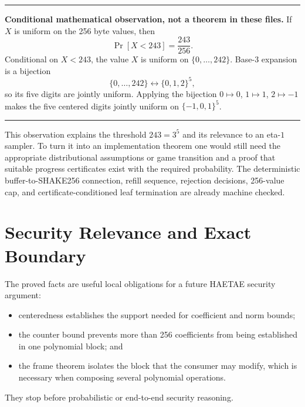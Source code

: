 \documentclass[11pt]{article}
\theoremstyle{definition}
\theoremstyle{plain}
\theoremstyle{remark}
\newenvironment{boundarybox}
  {\begin{center}\begin{minipage}{0.94\linewidth}\color{artifactred}\hrule\vspace{0.6em}\color{black}}
  {\vspace{0.6em}\color{artifactred}\hrule\end{minipage}\end{center}}
\begin{document}
\begin{boundarybox}
\textbf{Conditional mathematical observation, not a theorem in these files.}
If $X$ is uniform on the 256 byte values, then
\[
  \Pr[X<243]=\frac{243}{256}.
\]
Conditional on $X<243$, the value $X$ is uniform on
$\{0,\ldots,242\}$.  Base-3 expansion is a bijection
\[
  \{0,\ldots,242\}\longleftrightarrow\{0,1,2\}^{5},
\]
so its five digits are jointly uniform.  Applying the bijection
$0\mapsto0$, $1\mapsto1$, $2\mapsto-1$ makes the five centered digits jointly
uniform on $\{-1,0,1\}^{5}$.
\end{boundarybox}

This observation explains the threshold $243=3^5$ and its relevance to an
eta-$1$ sampler.  To turn it into an implementation theorem one would still
need the appropriate distributional assumptions or game transition and a
proof that suitable progress certificates exist with the required
probability.  The deterministic buffer-to-SHAKE256 connection, refill
sequence, rejection decisions, 256-value cap, and certificate-conditioned
leaf termination are already machine checked.

\section{Security Relevance and Exact Boundary}

The proved facts are useful local obligations for a future HAETAE security
argument:
\begin{itemize}
\item centeredness establishes the support needed for coefficient and norm
      bounds;
\item the counter bound prevents more than 256 coefficients from being
      established in one polynomial block; and
\item the frame theorem isolates the block that the consumer may modify,
      which is necessary when composing several polynomial operations.
\end{itemize}

They stop before probabilistic or end-to-end security reasoning.
\end{document}
